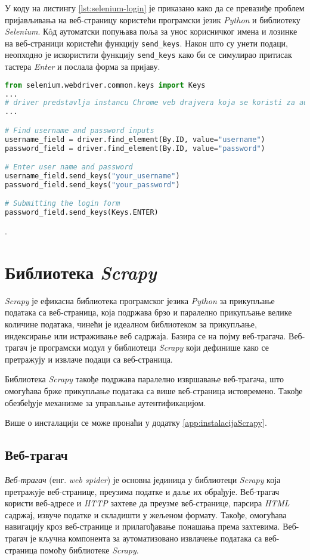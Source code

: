 \documentclass[12pt,oneside]{memoir}
\begin{document}
У коду на листингу \ref{lst:selenium-login} је приказано како да се превазиђе проблем пријављивања на веб-страницу користећи програмски језик \textit{Python} и библиотеку \textit{Selenium}. Кôд аутоматски попуњава поља за унос корисничког имена и лозинке на веб-страници користећи функцију \texttt{send\_keys}. Након што су унети подаци, неопходно је искористити функцију \texttt{send\_keys} како би се симулирао притисак тастера \textit{Enter} и послала форма за пријаву.

\begin{lstlisting}[language=Python, caption={Пријављивање на веб-страници}, label={lst:selenium-login}]
from selenium.webdriver.common.keys import Keys
...
# driver predstavlja instancu Chrome veb drajvera koja se koristi za automatizaciju pregledaca
...

# Find username and password inputs
username_field = driver.find_element(By.ID, value="username")
password_field = driver.find_element(By.ID, value="password")

# Enter user name and password
username_field.send_keys("your_username")
password_field.send_keys("your_password")

# Submitting the login form
password_field.send_keys(Keys.ENTER)
\end{lstlisting}.

\section{Библиотека \textit{Scrapy}}
\textit{Scrapy} је ефикасна библиотека програмског језика \textit{Python} за прикупљање података са веб-страница, која подржава брзо и паралелно прикупљање велике количине података, чинећи је идеалном библиотеком за прикупљање, индексирање или истраживање веб садржаја. Базира се на појму веб-трагача. Веб-трагач је програмски модул у библиотеци \textit{Scrapy} који дефинише како се претражују и извлаче подаци са веб-страница.

Библиотека \textit{Scrapy} такође подржава паралелно извршавање веб-трагача, што омогућава брже прикупљање података са више веб-страница истовремено. Такође обезбеђује механизме за управљање аутентификацијом.

Више о инсталацији се може пронаћи у додатку \ref{app:instalacijaScrapy}.

\subsection{Веб-трагач}
\emph{Веб-трагач} (енг. \textit{web spider}) је основна јединица у библиотеци \textit{Scrapy} која претражује веб-странице, преузима податке и даље их обрађује. Веб-трагач користи веб-адресе и \textit{HTTP} захтеве да преузме веб-странице, парсира \textit{HTML} садржај, извуче податке и складишти у жељеном формату. Такође, омогућава навигацију кроз веб-странице и прилагођавање понашања према захтевима. Веб-трагач је кључна компонента за аутоматизовано извлачење података са веб-страница помоћу библиотеке \textit{Scrapy}.  
\end{document}
